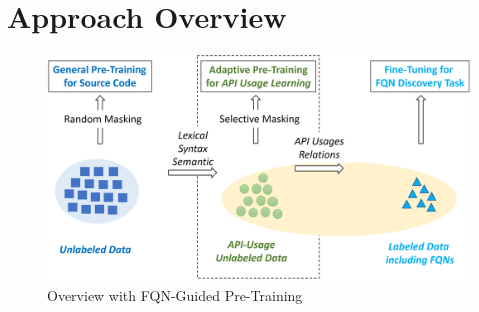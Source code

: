 \section{Approach Overview}
\label{sec:overview}

\begin{figure}[t] %
	\centering
	\includegraphics[width=\linewidth]{overview}
        \vspace{-3pt}
	\caption{{\tool} Overview with FQN-Guided Pre-Training}
	\label{fig:overview}
\end{figure}

